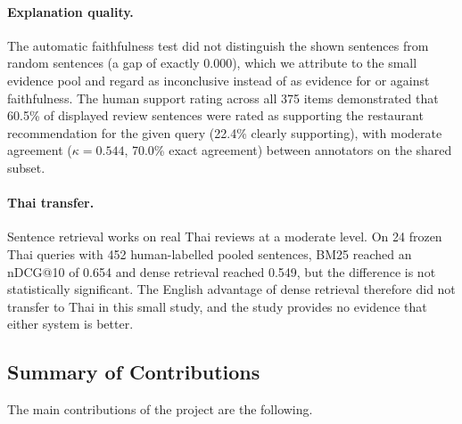 \paragraph{Explanation quality.} The automatic faithfulness test did not distinguish the shown sentences from random sentences (a gap of exactly 0.000), which we attribute to the small evidence pool and regard as inconclusive instead of as evidence for or against faithfulness. The human support rating across all 375 items demonstrated that 60.5\% of displayed review sentences were rated as supporting the restaurant recommendation for the given query (22.4\% clearly supporting), with moderate agreement ($\kappa = 0.544$, 70.0\% exact agreement) between annotators on the shared subset.

\paragraph{Thai transfer.} Sentence retrieval works on real Thai reviews at a moderate level. On 24 frozen Thai queries with 452 human-labelled pooled sentences, BM25 reached an nDCG@10 of 0.654 and dense retrieval reached 0.549, but the difference is not statistically significant. The English advantage of dense retrieval therefore did not transfer to Thai in this small study, and the study provides no evidence that either system is better.

\subsection{Summary of Contributions}
\label{sec:contributions}

The main contributions of the project are the following.

